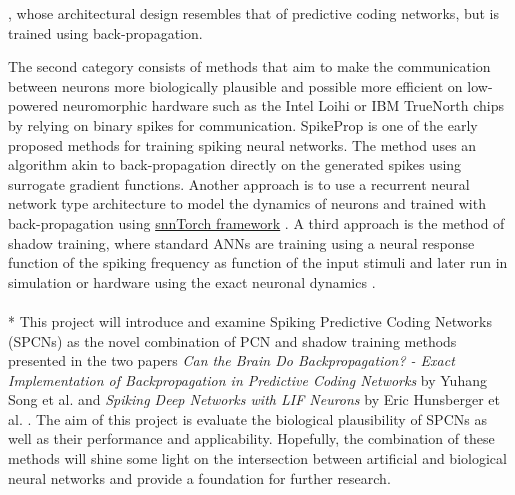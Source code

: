 \documentclass[a4paper,11pt]{article} %
\begin{document}
\cite{lotter-prednet}, whose architectural design resembles that of predictive coding networks, but is trained using back-propagation. 

The second category consists of methods that aim to make the communication between neurons more biologically plausible and possible more efficient on low-powered neuromorphic hardware such as the Intel Loihi or IBM TrueNorth chips by relying on binary spikes for communication. SpikeProp \cite{Boht2000SpikePropBF} is one of the early proposed methods for training spiking neural networks. The method uses an algorithm akin to back-propagation directly on the generated spikes using surrogate gradient functions. Another approach is to use a recurrent neural network type architecture to model the dynamics of neurons and trained with back-propagation using \href{https://snntorch.readthedocs.io/en/latest/}{snnTorch framework} \cite{eshraghian2021training}. A third approach is the method of shadow training, where standard ANNs are training using a neural response function of the spiking frequency as function of the input stimuli and later run in simulation or hardware using the exact neuronal dynamics \cite{hunsberger2015spiking}. \\
\\*
This project will introduce and examine Spiking Predictive Coding Networks (SPCNs) as the novel combination of PCN and shadow training methods presented in the two papers \textit{Can the Brain Do Backpropagation? - Exact Implementation of Backpropagation in Predictive Coding Networks} by Yuhang Song et al. \cite{PredictiveCodingNetworks} and \textit{Spiking Deep Networks with LIF Neurons} by Eric Hunsberger et al. \cite{hunsberger2015spiking}. The aim of this project is evaluate the biological plausibility of SPCNs as well as their performance and
applicability. Hopefully, the combination of these methods will shine some light on the intersection between artificial and biological neural networks and provide a foundation for further research.


\newpage
\end{document}
